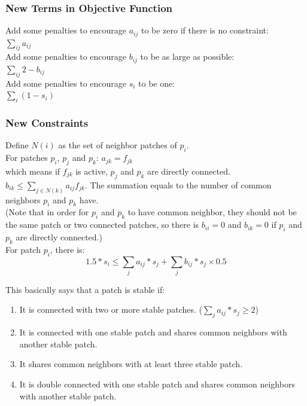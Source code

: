 \documentclass{article}
\begin{document}
\subsubsection{New Terms in Objective Function}
Add some penalties to encourage $a_{ij}$ to be zero if there is no constraint:\\
$\sum_{ij}a_{ij}$\\
Add some penalties to encourage $b_{ij}$ to be as large as possible:\\
$\sum_{ij}{2 - b_{ij}}$\\
Add some penalties to encourage $s_{i}$ to be one:\\
$\sum_{i}(1 - s_i)$\\

\subsubsection{New Constraints}
Define $N(i)$ as the set of neighbor patches of $p_i$.\\
For patches $p_i$, $p_j$ and $p_k$:
$a_{jk} = f_{jk}$\\ which means if $f_{jk}$ is active, $p_j$ and $p_k$ are directly connected.\\
$b_{ik} \leq \sum_{j \in N(k)}{a_{ij}}f_{jk}$. The summation equals to the number of common neighbors $p_i$ and $p_k$ have.\\
(Note that in order for $p_i$ and $p_k$ to have common neighbor, they should not be the same patch or two connected patches, so there is $b_{ii} = 0$ and $b_{ik} = 0$ if $p_i$ and $p_k$ are directly connected.)\\

For patch $p_i$, there is:\\
\begin{equation}
  1.5 * s_i \leq \sum_j{a_{ij} * s_j} + \sum_j{b_{ij} * s_j} \times 0.5
  \label{eq:stability}
\end{equation}

This basically says that a patch is stable if:
\begin{enumerate}
\item It is connected with two or more stable patches. ($\sum_j{a_{ij} * s_j} \geq 2$)
\item It is connected with one stable patch and shares common neighbors with another stable patch.
\item It shares common neighbors with at least three stable patch.
\item It is double connected with one stable patch and shares common neighbors with another stable patch.
\end{enumerate}
\end{document}
